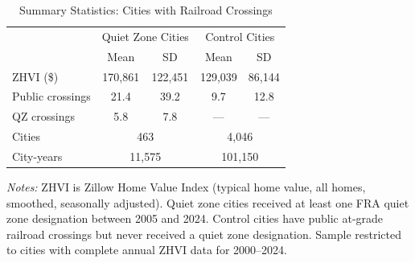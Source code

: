 \begin{table}[t]
\centering
\caption{Summary Statistics: Cities with Railroad Crossings}
\label{tab:summary}
\begin{tabular}{lcccc}
\hline\hline
 & \multicolumn{2}{c}{Quiet Zone Cities} & \multicolumn{2}{c}{Control Cities} \\
 & Mean & SD & Mean & SD \\
\hline
ZHVI (\$) & 170,861 & 122,451 & 129,039 & 86,144 \\
Public crossings & 21.4 & 39.2 & 9.7 & 12.8 \\
QZ crossings & 5.8 & 7.8 & --- & --- \\
\hline
Cities & \multicolumn{2}{c}{463} & \multicolumn{2}{c}{4,046} \\
City-years & \multicolumn{2}{c}{11,575} & \multicolumn{2}{c}{101,150} \\
\hline\hline
\end{tabular}
\par\vspace{0.3em}
{\footnotesize \textit{Notes:} ZHVI is Zillow Home Value Index (typical home value, all homes, smoothed, seasonally adjusted). Quiet zone cities received at least one FRA quiet zone designation between 2005 and 2024. Control cities have public at-grade railroad crossings but never received a quiet zone designation. Sample restricted to cities with complete annual ZHVI data for 2000--2024.}
\end{table}

